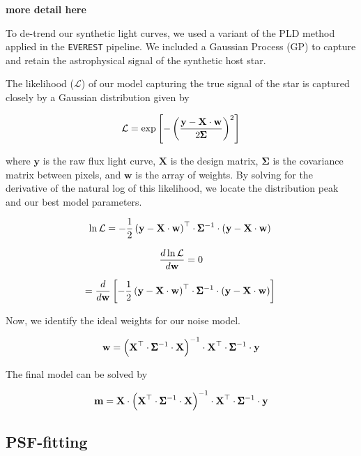 \documentclass[12pt,preprint]{emulateapj}
\begin{document}
\textbf{more detail here}

To de-trend our synthetic light curves, we used a variant of the PLD method applied in the \texttt{EVEREST} pipeline. We included a Gaussian Process (GP) to capture and retain the astrophysical signal of the synthetic host star.

The likelihood ($\mathcal{L}$) of our model capturing the true signal of the star is captured closely by a Gaussian distribution given by

\[
\mathcal{L} = \exp{\left[-\left( \frac{\textbf{y}-\textbf{X}\cdot\textbf{w}}{2\pmb{\Sigma}} \right)^2 \right]} \\
\]

where $\textbf{y}$ is the raw flux light curve, $\textbf{X}$ is the design matrix, $\pmb{\Sigma}$ is the covariance matrix between pixels, and $\textbf{w}$ is the array of weights. By solving for the derivative of the natural log of this likelihood, we locate the distribution peak and our best model parameters.

\[
\ln{\mathcal{L}} = - \frac{1}{2}\left(\textbf{y} - \textbf{X}\cdot\textbf{w} \right)^\top \cdot \pmb{\Sigma}^{-1} \cdot \left(\textbf{y} - \textbf{X}\cdot\textbf{w} \right) \\
\]

\[
\frac{d\ln{\mathcal{L}}}{d \textbf{w}} = 0 \\
\]

\[
=\frac{d}{d \textbf{w}} \left[ - \frac{1}{2} \left(\textbf{y} - \textbf{X}\cdot\textbf{w} \right)^\top \cdot \pmb{\Sigma}^{-1} \cdot \left(\textbf{y} - \textbf{X}\cdot\textbf{w} \right) \right] \\
\]

Now, we identify the ideal weights for our noise model.

\[
\textbf{w} = \left( \textbf{X}^\top \cdot \pmb{\Sigma}^{-1} \cdot \textbf{X} \right)^{-1} \cdot \textbf{X}^\top \cdot \pmb{\Sigma}^{-1} \cdot \textbf{y} \\
\]

The final model can be solved by

\[
\textbf{m} = \textbf{X} \cdot \left( \textbf{X}^\top \cdot \pmb{\Sigma}^{-1} \cdot \textbf{X} \right)^{-1} \cdot \textbf{X}^\top \cdot \pmb{\Sigma}^{-1} \cdot \textbf{y} \\
\]

\subsection{PSF-fitting}
\end{document}
